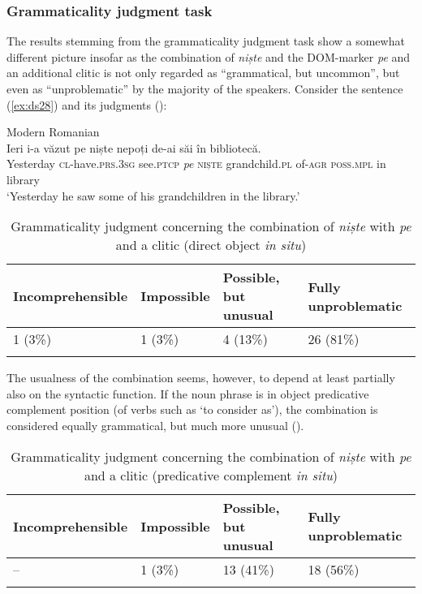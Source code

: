 \documentclass[output=paper,colorlinks,citecolor=brown]{langscibook}
\begin{document}
\subsubsection{Grammaticality judgment task}\label{sec:ds4.5.2}
The results stemming from the grammaticality judgment task show a somewhat different picture insofar as the combination of \textit{niște} and the DOM-marker \textit{pe} and an additional clitic is not only regarded as “grammatical, but uncommon”, but even as “unproblematic” by the majority of the speakers. Consider the sentence (\ref{ex:ds28}) and its judgments ():\largerpage

\ea\label{ex:ds28} Modern Romanian\\
\gll Ieri      i-a       v\u{a}zut       pe niște nepoți           de-ai   s\u{a}i        în bibliotec\u{a}.\\
     Yesterday \textsc{cl}{}-have.\textsc{prs.3sg}   see.\textsc{ptcp} \textit{pe} \textsc{niște} grandchild.\textsc{pl} of-\textsc{agr}   \textsc{poss}.\textsc{mpl} in library\\
\glt ‘Yesterday he saw some of his grandchildren in the library.’
\z

\begin{table}
\begin{tabularx}{\textwidth}{XXXX}
\lsptoprule
Incomprehensible & Impossible & Possible, \linebreak but unusual & Fully \linebreak \mbox{unproblematic}\\
\midrule
1 (3\%) & 1 (3\%) & 4 (13\%) & 26 (81\%)\\
\lspbottomrule
\end{tabularx}
\caption{Grammaticality judgment concerning the combination of \textit{niște} with \textit{pe} and a clitic (direct object \textit{in situ})}
\label{tab:ds8}
\end{table}

The usualness of the combination seems, however, to depend at least partially also on the syntactic function. If the noun phrase is in object predicative complement position (of verbs such as ‘to consider as’), the combination is considered equally grammatical, but much more unusual ().

\begin{table}
\begin{tabularx}{\textwidth}{XXXX}
\lsptoprule
Incomprehensible & Impossible & Possible, \linebreak but unusual & Fully \linebreak \mbox{unproblematic}\\
\midrule
-- & 1 (3\%) & 13 (41\%) & 18 (56\%)\\
\lspbottomrule
\end{tabularx}
\caption{Grammaticality judgment concerning the combination of \textit{niște} with \textit{pe} and a clitic (predicative complement \textit{in situ})}
\label{tab:ds9}
\end{table}
\end{document}
